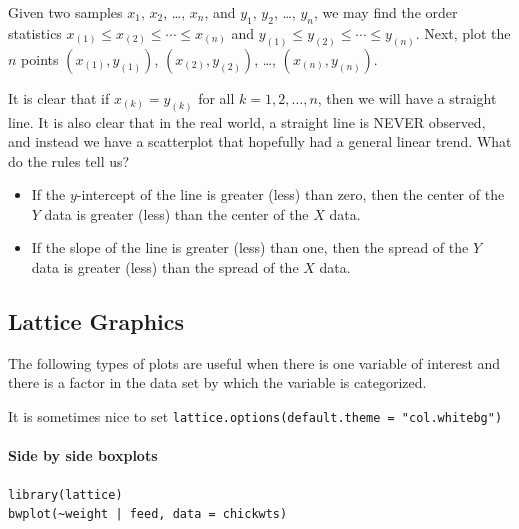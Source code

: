 \documentclass[captions=tableheading]{scrbook}
\begin{document}
Given two samples \(x_{1}\), \(x_{2}\), \ldots{}, \(x_{n}\), and \(y_{1}\), \(y_{2}\), \ldots{}, \(y_{n}\), we may find the order statistics \(x_{(1)}\leq x_{(2)}\leq\cdots\leq x_{(n)}\) and \(y_{(1)}\leq y_{(2)}\leq\cdots\leq y_{(n)}\). Next, plot the \(n\) points \((x_{(1)},y_{(1)})\), \((x_{(2)},y_{(2)})\), \ldots{}, \((x_{(n)},y_{(n)})\).

It is clear that if \(x_{(k)}=y_{(k)}\) for all \(k=1,2,\ldots,n\), then we will have a straight line. It is also clear that in the real world, a straight line is NEVER observed, and instead we have a scatterplot that hopefully had a general linear trend. What do the rules tell us? 

\begin{itemize}
\item If the \(y\)-intercept of the line is greater (less) than zero, then the center of the \(Y\) data is greater (less) than the center of the \(X\) data.
\item If the slope of the line is greater (less) than one, then the spread of the \(Y\) data is greater (less) than the spread of the \(X\) data.
\end{itemize}
\subsection{Lattice Graphics}
\label{sec-2-6-3}

\label{sub:Lattice-Graphics}

The following types of plots are useful when there is one variable of interest and there is a factor in the data set by which the variable is categorized. 

It is sometimes nice to set \texttt{lattice.options(default.theme = "col.whitebg")}


\paragraph*{Side by side boxplots}


\begin{verbatim}
library(lattice)
bwplot(~weight | feed, data = chickwts)
\end{verbatim}
\end{document}

